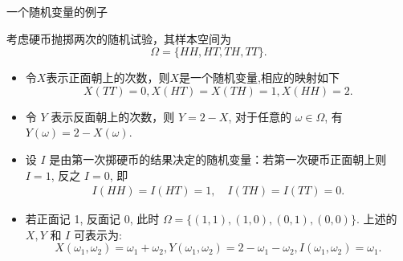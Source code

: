 \begin{frame}{一个随机变量的例子}
	\begin{exam}\label{312}
		考虑硬币抛掷两次的随机试验，其样本空间为 $$\Omega=\{HH,HT,TH,TT\}.$$ %
		\begin{itemize}[<+-|alert@+>]
			\item 令$X$表示正面朝上的次数，则$X$是一个随机变量,相应的映射如下
			      $$X(TT)=0, X(HT)=X(TH)=1, X(HH)=2.$$
			\item 令 $Y$ 表示反面朝上的次数，则 $Y=2-X$, 对于任意的 $\omega\in \Omega$, 有 $Y (\omega)=2-X (\omega)$.
			\item 设 $I$ 是由第一次掷硬币的结果决定的随机变量：若第一次硬币正面朝上则 $I=1$, 反之 $I=0$, 即
			      \begin{align*}
				      I(HH)=I(HT)=1,\quad I(TH)=I(TT)=0.
			      \end{align*}
			\item 若正面记 1, 反面记 0, 此时 $\Omega=\{(1,1),(1,0),(0,1),(0,0)\}$. 上述的 $X,Y$ 和 $I$ 可表示为:$$X (\omega_1,\omega_2)=\omega_1+\omega_2,Y (\omega_1,\omega_2)=2-\omega_1-\omega_2,I (\omega_1,\omega_2)=\omega_1.$$
		\end{itemize}
	\end{exam}
\end{frame}



